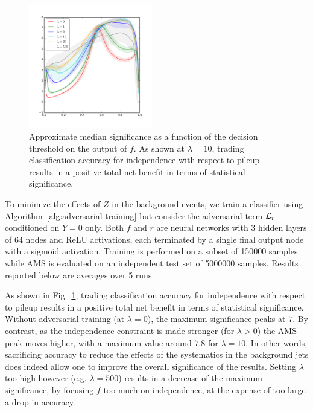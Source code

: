 \documentclass[twocolumn,superscriptaddress,aps]{revtex4-1}
\theoremstyle{plain}
\begin{document}
\begin{figure}
    \includegraphics[width=0.48\textwidth]{figures/ams.pdf}
    \vspace{-1cm}
    \caption{Approximate median significance as a function of the decision threshold
             on the output of $f$.  As shown at $\lambda=10$, trading
             classification accuracy for independence with respect to pileup
             results in a positive total net benefit in terms of statistical significance.}
    \label{fig:physics-ams}
\end{figure}

To minimize the effects of $Z$ in the background events, we train a
classifier using  Algorithm~\ref{alg:adversarial-training} but consider the
adversarial term ${\cal L}_r$ conditioned on $Y=0$ only. Both $f$ and $r$ are
neural networks with 3 hidden layers of 64 nodes and ReLU activations, each
terminated by a single final output node with a sigmoid activation. Training is
performed on a subset of 150000 samples while AMS is evaluated on an independent
test set of 5000000 samples. Results reported below are averages over 5 runs.

As shown in  Fig.~\ref{fig:physics-ams}, trading classification accuracy for
independence with respect to pileup results in a positive total net benefit in
terms of statistical significance. Without adversarial training (at
$\lambda=0$), the maximum significance peaks at $7$. By contrast, as the
independence constraint is made stronger (for $\lambda > 0$) the AMS peak moves
higher, with a maximum value around  $7.8$ for $\lambda=10$. In other words,
sacrificing accuracy to reduce  the  effects of the systematics in the
background jets does indeed allow one to improve the overall significance of the
results. Setting $\lambda$ too high however (e.g. $\lambda=500$) results in a
decrease of the maximum significance, by focusing $f$ too much on independence,
at the expense of too large a drop in accuracy.
\end{document}
